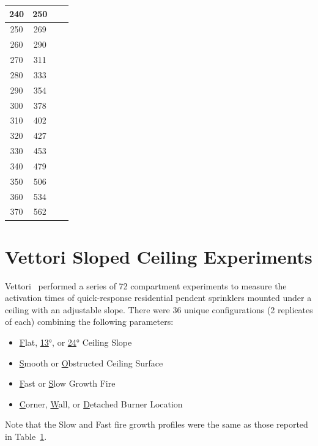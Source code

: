 \begin{table}[h!]
\begin{tabular}{|c|c|c|c|}
240      &  250     &            &        \\ \hline
250      &  269     &            &        \\ \hline
260      &  290     &            &        \\ \hline
270      &  311     &            &        \\ \hline
280      &  333     &            &        \\ \hline
290      &  354     &            &        \\ \hline
300      &  378     &            &        \\ \hline
310      &  402     &            &        \\ \hline
320      &  427     &            &        \\ \hline
330      &  453     &            &        \\ \hline
340      &  479     &            &        \\ \hline
350      &  506     &            &        \\ \hline
360      &  534     &            &        \\ \hline
370      &  562     &            &        \\ \hline
\end{tabular}
\label{Vettori_Ramps}
\end{table}

\section{Vettori Sloped Ceiling Experiments}
\label{Vettori_Sloped_Ceiling_Description}

Vettori~\cite{Vettori:2} performed a series of 72 compartment experiments to measure the activation times of quick-response residential pendent sprinklers mounted under a ceiling with an adjustable slope. There were 36 unique configurations (2 replicates of each) combining the following parameters:
\begin{itemize}
\item \underline{F}lat, \underline{13}\unit{\degree}, or \underline{24}\unit{\degree} Ceiling Slope
\item \underline{S}mooth or \underline{O}bstructed Ceiling Surface
\item \underline{F}ast or \underline{S}low Growth Fire
\item \underline{C}orner, \underline{W}all, or \underline{D}etached Burner Location
\end{itemize}
Note that the Slow and Fast fire growth profiles were the same as those reported in Table~\ref{Vettori_Ramps}.





